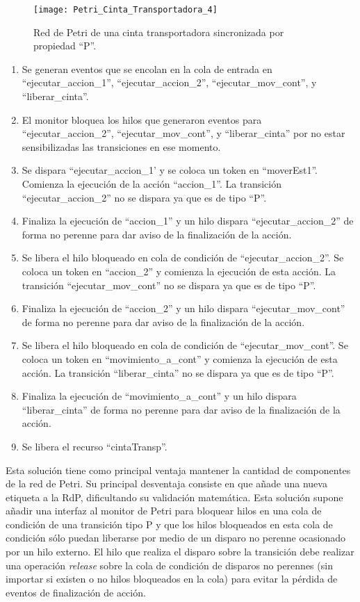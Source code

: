 \begin{figure}[H]
    \centering
    \texttt{[image: Petri\_Cinta\_Transportadora\_4]}
    \caption{Red de Petri de una cinta transportadora sincronizada por
    propiedad ``P''.}
    \label{fig:petri_cinta_transportadora_4}
\end{figure}

\begin{enumerate}
    \item Se generan eventos que se encolan en la cola de entrada en
    ``ejecutar\_accion\_1'', ``ejecutar\_accion\_2'', ``ejecutar\_mov\_cont'',
    y ``liberar\_cinta''.
	\item El monitor bloquea los hilos que generaron eventos para
	``ejecutar\_accion\_2'', ``ejecutar\_mov\_cont'', y ``liberar\_cinta'' por
	no estar sensibilizadas las transiciones en ese momento.
	\item Se dispara ``ejecutar\_accion\_1' y se coloca un token en ``moverEst1''.
	Comienza la ejecución de la acción ``accion\_1''. La transición
	``ejecutar\_accion\_2'' no se dispara ya que es de tipo ``P''.
	\item Finaliza la ejecución de ``accion\_1'' y un hilo dispara 
	``ejecutar\_accion\_2'' de forma no perenne para dar aviso de la finalización
	de la acción.
	\item Se libera el hilo bloqueado en cola de condición de
	``ejecutar\_accion\_2''. Se coloca un token en ``accion\_2'' y comienza la
	ejecución de esta acción. La transición ``ejecutar\_mov\_cont'' no se dispara
	ya que es de tipo ``P''.
	\item Finaliza la ejecución de ``accion\_2'' y un hilo dispara
	``ejecutar\_mov\_cont'' de forma no perenne para dar aviso de la finalización
	de la acción.
	\item  Se libera el hilo bloqueado en cola de condición de
	``ejecutar\_mov\_cont''. Se coloca un token en ``movimiento\_a\_cont'' y
	comienza la ejecución de esta acción. La transición ``liberar\_cinta'' no se dispara ya
	que es de tipo ``P''.
	\item Finaliza la ejecución de ``movimiento\_a\_cont'' y un hilo dispara
	``liberar\_cinta'' de forma no perenne para dar aviso de la finalización de la
	acción.
	\item Se libera el recurso ``cintaTransp''.
\end{enumerate}

Esta solución tiene como principal ventaja mantener la cantidad de componentes
de la red de Petri.
Su principal desventaja consiste en que añade una nueva etiqueta a la
RdP, dificultando su validación matemática. Esta solución supone añadir
una interfaz al monitor de Petri para bloquear hilos en una cola de condición de
una transición tipo P y que los hilos bloqueados en esta cola de condición sólo
puedan liberarse por medio de un disparo no perenne ocasionado por un hilo
externo.
El hilo que realiza el disparo sobre la transición debe realizar una operación
\emph{release} sobre la cola de condición de disparos no perennes (sin importar
si existen o no hilos bloqueados en la cola) para evitar la pérdida de eventos de
finalización de acción.


